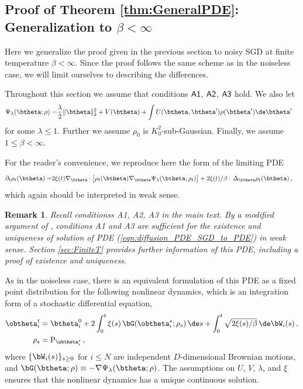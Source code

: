 \documentclass[11pt]{article}
\newtheorem{remark}{Remark}[section]
\begin{document}
\subsection{Proof of Theorem \ref{thm:GeneralPDE}: Generalization to $\beta<\infty$}

Here we generalize the proof given in the previous section to noisy SGD at finite temperature $\beta<\infty$. Since the proof follows the same
scheme as in the noiseless case, we will limit ourselves to describing the differences. %


Throughout this section we assume that conditions ${\sf A1}$, ${\sf A2}$, ${\sf A3}$ hold. We also let
\begin{align}
\Psi_\lambda(\btheta; \rho) =& \frac{\lambda}{2} \| \btheta \|_2^2 + V(\btheta) + \int U(\btheta, \btheta') \rho(\btheta') \de \btheta'
\end{align}
for some $\lambda \le 1$. Further we assume $\rho_0$ is $K_0^2$-sub-Gaussian. Finally, we assume $1 \le \beta < \infty$. 

For the reader's convenience, we reproduce here the form of the limiting PDE
\begin{align}\label{eqn:diffusion_PDE_SGD_to_PDE}
\partial_t\rho_t(\btheta) =& 2 \xi(t) \nabla_\btheta \cdot \big[\rho_t(\btheta)\nabla_\btheta \Psi_\lambda(\btheta;\rho_t)\big]+2\xi(t)/\beta \cdot \,\Delta_\btheta \rho_t(\btheta)\,,
\end{align}
which again should be interpreted in weak sense. 

\begin{remark} \label{rmk:ExistenceUniqueness_Noisy}
Recall conditionss {\sf A1}, {\sf A2}, {\sf A3} in the main text. 
By a modified argument of \cite[Theorem 1.1]{sznitman1991topics}, conditions {\sf A1} and {\sf A3} are sufficient  for the existence and uniqueness of solution of PDE (\ref{eqn:diffusion_PDE_SGD_to_PDE}) in weak sense. Section \ref{sec:FiniteT} provides further information of this PDE, including a proof of existence and uniqueness. 
\end{remark}


As in the noiseless case, there is an equivalent formulation of this PDE as a fixed point distribution for the following nonlinear dynamics, which is an integration form of a stochastic differential equation, 
\begin{align}
\obtheta^t_i &=\btheta^0_i+2\int_{0}^t\xi(s)\, \bG(\obtheta_i^s;\rho_s)\, \de s + \int_0^t \sqrt{2\xi(s) / \beta}\, \de \bW_i(s)\, ,\label{eq:NonLinearEvolutionNoisy}\\
\rho_s & = {\rm P}_{\obtheta^s_i}\, ,
\end{align}
where $\{\bW_i(s)\}_{s\ge 0}$ for $i \le N$ are independent $D$-dimensional Brownian motions, and  $\bG(\btheta;\rho) \equiv -\nabla\Psi_\lambda(\btheta;\rho)$. The assumptions on $U$, $V$, $\lambda$, and $\xi$ ensures that this nonlinear dynamics has a unique continuous solution. 
\end{document}
